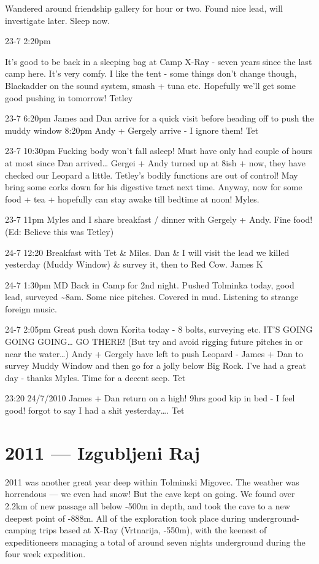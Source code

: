 Wandered around friendship gallery for hour or two. Found nice lead,
will investigate later. Sleep now.

23-7 2:20pm

It's good to be back in a sleeping bag at Camp X-Ray - seven years since
the last camp here. It's very comfy. I like the tent - some things don't
change though, Blackadder on the sound system, smash + tuna etc.
Hopefully we'll get some good pushing in tomorrow! Tetley

23-7 6:20pm James and Dan arrive for a quick visit before heading off to
push the muddy window 8:20pm Andy + Gergely arrive - I ignore them! Tet

23-7 10:30pm Fucking body won't fall asleep! Must have only had couple
of hours at most since Dan arrived\ldots{} Gergei + Andy turned up at
8ish + now, they have checked our Leopard a little. Tetley's bodily
functions are out of control! May bring some corks down for his
digestive tract next time. Anyway, now for some food + tea + hopefully
can stay awake till bedtime at noon! Myles.

23-7 11pm Myles and I share breakfast / dinner with Gergely + Andy. Fine
food! (Ed: Believe this was Tetley)

24-7 12:20 Breakfast with Tet \& Miles. Dan \& I will visit the lead we
killed yesterday (Muddy Window) \& survey it, then to Red Cow. James K

24-7 1:30pm MD Back in Camp for 2nd night. Pushed Tolminka today, good
lead, surveyed \textasciitilde{}8am. Some nice pitches. Covered in mud.
Listening to strange foreign music.

24-7 2:05pm Great push down Korita today - 8 bolts, surveying etc. IT'S
GOING GOING GOING\ldots{} GO THERE! (But try and avoid rigging future
pitches in or near the water\ldots{}) Andy + Gergely have left to push
Leopard - James + Dan to survey Muddy Window and then go for a jolly
below Big Rock. I've had a great day - thanks Myles. Time for a decent
seep. Tet

23:20 24/7/2010 James + Dan return on a high! 9hrs good kip in bed - I
feel good! forgot to say I had a shit yesterday\ldots{}. Tet

\hypertarget{izgubljeni-raj}{%
\chapter{2011 --- Izgubljeni Raj}\label{izgubljeni-raj}}

2011 was another great year deep within Tolminski Migovec. The weather
was horrendous --- we even had snow! But the cave kept on going. We
found over 2.2km of new passage all below -500m in depth, and took the
cave to a new deepest point of -888m. All of the exploration took place
during underground-camping trips based at X-Ray (Vrtnarija, -550m), with
the keenest of expeditioneers managing a total of around seven nights
underground during the four week expedition.

